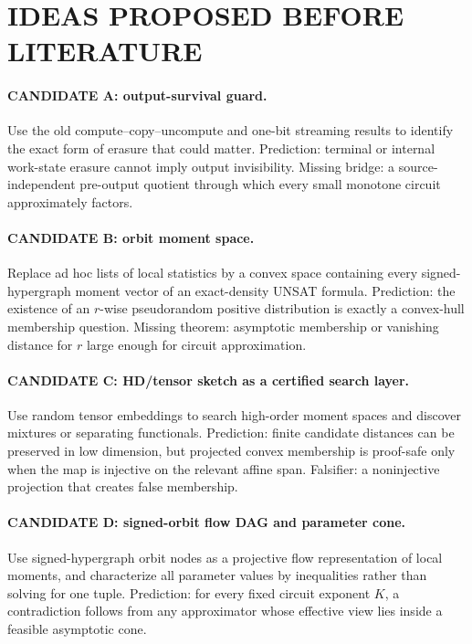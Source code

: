 \documentclass[11pt]{article}
\begin{document}
\section{IDEAS PROPOSED BEFORE LITERATURE}
\paragraph{CANDIDATE A: output-survival guard.}
Use the old compute--copy--uncompute and one-bit streaming results to identify the exact form of erasure that could matter. Prediction: terminal or internal work-state erasure cannot imply output invisibility. Missing bridge: a source-independent pre-output quotient through which every small monotone circuit approximately factors.

\paragraph{CANDIDATE B: orbit moment space.}
Replace ad hoc lists of local statistics by a convex space containing every signed-hypergraph moment vector of an exact-density UNSAT formula. Prediction: the existence of an $r$-wise pseudorandom positive distribution is exactly a convex-hull membership question. Missing theorem: asymptotic membership or vanishing distance for $r$ large enough for circuit approximation.

\paragraph{CANDIDATE C: HD/tensor sketch as a certified search layer.}
Use random tensor embeddings to search high-order moment spaces and discover mixtures or separating functionals. Prediction: finite candidate distances can be preserved in low dimension, but projected convex membership is proof-safe only when the map is injective on the relevant affine span. Falsifier: a noninjective projection that creates false membership.

\paragraph{CANDIDATE D: signed-orbit flow DAG and parameter cone.}
Use signed-hypergraph orbit nodes as a projective flow representation of local moments, and characterize all parameter values by inequalities rather than solving for one tuple. Prediction: for every fixed circuit exponent $K$, a contradiction follows from any approximator whose effective view lies inside a feasible asymptotic cone.
\end{document}
